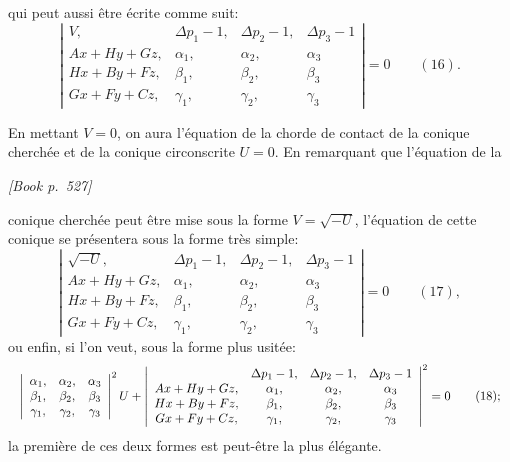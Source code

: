 \documentclass[11pt]{article}
\begin{document}
qui peut aussi \^etre \'ecrite comme suit:
\[
\left|\begin{array}{cccc}
V, & \Delta p_{1} - 1, & \Delta p_{2} - 1, & \Delta p_{3} - 1 \\
A x + H y + G z, & \alpha_{1}, & \alpha_{2}, & \alpha_{3} \\
H x + B y + F z, & \beta_{1}, & \beta_{2}, & \beta_{3} \\
G x + F y + C z, & \gamma_{1}, & \gamma_{2}, & \gamma_{3}
\end{array}\right| = 0\qquad (16).
\]

En mettant $V=0$, on aura l'\'equation de la chorde de contact de la conique cherch\'ee et de la conique circonscrite $U=0$. En remarquant que l'\'equation de la

\medskip
\noindent\textit{[Book p.~527]}\hfill

\smallskip

\noindent conique cherch\'ee peut \^etre mise sous la forme $V = \sqrt{-U}$, l'\'equation de cette conique se pr\'esentera sous la forme tr\`es simple:
\[
\left|\begin{array}{cccc}
\sqrt{-U}, & \Delta p_{1} - 1, & \Delta p_{2} - 1, & \Delta p_{3} - 1 \\
A x + H y + G z, & \alpha_{1}, & \alpha_{2}, & \alpha_{3} \\
H x + B y + F z, & \beta_{1}, & \beta_{2}, & \beta_{3} \\
G x + F y + C z, & \gamma_{1}, & \gamma_{2}, & \gamma_{3}
\end{array}\right| = 0\qquad (17),
\]
ou enfin, si l'on veut, sous la forme plus usit\'ee:
\[ \resizebox{\textwidth}{!}{$\displaystyle
\left|\begin{array}{ccc}
\alpha_{1}, & \alpha_{2}, & \alpha_{3} \\
\beta_{1}, & \beta_{2}, & \beta_{3} \\
\gamma_{1}, & \gamma_{2}, & \gamma_{3}
\end{array}\right|^{2} U + \left|\begin{array}{cccc}
 & \Delta p_{1} - 1, & \Delta p_{2} - 1, & \Delta p_{3} - 1 \\
A x + H y + G z, & \alpha_{1}, & \alpha_{2}, & \alpha_{3} \\
H x + B y + F z, & \beta_{1}, & \beta_{2}, & \beta_{3} \\
G x + F y + C z, & \gamma_{1}, & \gamma_{2}, & \gamma_{3}
\end{array}\right|^{2} = 0\qquad (18);
$} \]
la premi\`ere de ces deux formes est peut-\^etre la plus \'el\'egante.
\end{document}
